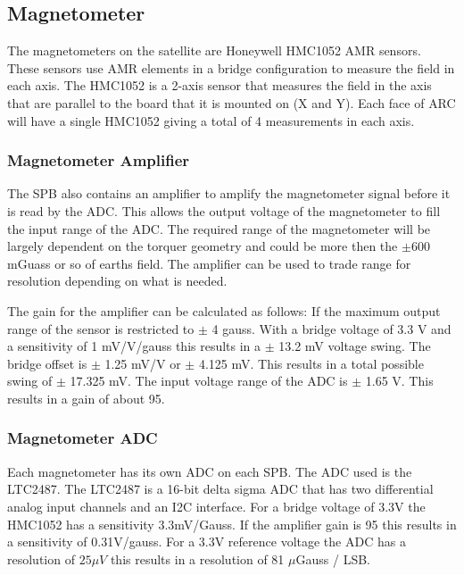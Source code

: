 \subsection{Magnetometer}

The magnetometers on the satellite are Honeywell HMC1052 \ac{AMR} sensors. These sensors use \ac{AMR} elements in a bridge configuration to measure the field in each axis. The HMC1052 is a 2-axis sensor that measures the field in the axis that are parallel to the board that it is mounted on (X and Y). Each face of \ac{ARC} will have a single HMC1052 giving a total of 4 measurements in each axis.

\subsubsection{Magnetometer Amplifier}

The \ac{SPB} also contains an amplifier to amplify the magnetometer signal before it is read by the \ac{ADC}. This allows the output voltage of the magnetometer to fill the input range of the \ac{ADC}. The required range of the magnetometer will be largely dependent on the torquer geometry and could be more then the $\pm$600 mGuass or so of earths field. The amplifier can be used to trade range for resolution depending on what is needed.

The gain for the amplifier can be calculated as follows: If the maximum output range of the sensor is restricted to $\pm$ 4 gauss. With a bridge voltage of 3.3 V and a sensitivity of 1 mV/V/gauss this results in a $\pm$ 13.2 mV voltage swing. The bridge offset is $\pm$ 1.25 mV/V or $\pm$ 4.125 mV. This results in a total possible swing of $\pm$ 17.325 mV. The input voltage range of the \ac{ADC} is $\pm$ 1.65 V. This results in a gain of about 95. 

\subsubsection{Magnetometer \acl{ADC}}

Each magnetometer has its own \ac{ADC} on each \ac{SPB}. The \ac{ADC} used is the LTC2487. The LTC2487 is a 16-bit delta sigma \ac{ADC} that has two differential analog input channels and an \ac{I2C} interface. For a bridge voltage of 3.3V the HMC1052 has a sensitivity 3.3mV/Gauss. If the amplifier gain is 95 this results in a sensitivity of 0.31V/gauss. For a 3.3V reference voltage the \ac{ADC} has a resolution of $25 \mu V$ this results in a resolution of 81 $\mu$Gauss / LSB.

